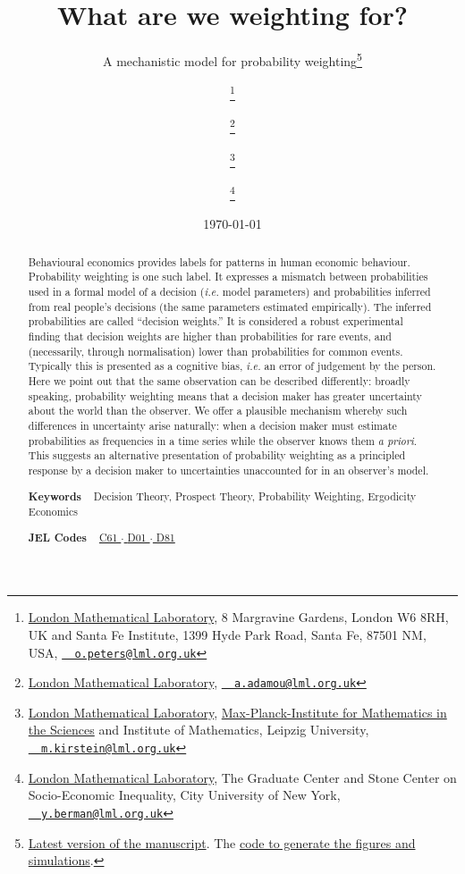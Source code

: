 \documentclass[%
	a4paper,
	abstract=true,	
	12pt,
	numbers=noenddot,
]{scrartcl}
\title{What are we weighting for?}
\subtitle{A mechanistic model for probability weighting\thanks{\href{https://bit.ly/LML-pw}{Latest version of the manuscript}. The \href{https://bit.ly/lml_pw_code}{code to generate the figures and simulations}.}}
\author{
	\person{Ole Peters}\footnote{\href{http://lml.org.uk/people/ole-peters-2}{London Mathematical Laboratory}, 8 Margravine Gardens, London W6 8RH, UK and Santa Fe Institute, 1399 Hyde Park Road, Santa Fe, 87501 NM, USA, \texttt{\href{mailto:o.peters@lml.org.uk}{~\Letter~o.peters@lml.org.uk}}} \and
	\person{Alexander Adamou}\footnote{\href{http://lml.org.uk/people/alex-adamou-2}{London Mathematical Laboratory}, \texttt{\href{mailto:a.adamou@lml.org.uk}{~\Letter~a.adamou@lml.org.uk}}} \and
	\person{Mark Kirstein}\footnote{\href{https://bit.ly/LMLMK}{London Mathematical Laboratory}, \href{https://www.mis.mpg.de/jjost/research/economics.html}{Max-Planck-Institute for Mathematics in the Sciences} and Institute of Mathematics, Leipzig University, \texttt{\href{mailto:m.kirstein@lml.org.uk}{~\Letter~m.kirstein@lml.org.uk}}} \and 
	\person{Yonatan Berman}\footnote{\href{http://lml.org.uk/people/yonatan-berman/}{London Mathematical Laboratory}, The Graduate Center and Stone Center on Socio-Economic Inequality, City University of New York, \texttt{\href{mailto:y.berman@lml.org.uk}{~\Letter~y.berman@lml.org.uk}}}
}
\date{\today}
\newcommand{\ie}{\textit{i.e.}\xspace}
\begin{document}
\begin{titlepage}
	\maketitle
\thispagestyle{fancy}

\begin{abstract}
\noindent 
Behavioural economics provides labels for patterns in human economic behaviour. Probability weighting is one such label. It expresses a mismatch between probabilities used in a formal model of a decision (\ie model parameters) and probabilities inferred from real people's decisions (the same parameters estimated empirically). The inferred probabilities are called ``decision weights.'' It is considered a robust experimental finding that decision weights are higher than probabilities for rare events, and (necessarily, through normalisation) lower than probabilities for common events. Typically this is presented as a cognitive bias, \ie an error of judgement by the person. %
Here we point out that the same observation can be described differently: broadly speaking, probability weighting means that a decision maker has greater uncertainty about the world than the observer.
We offer a plausible mechanism whereby such differences in uncertainty arise naturally: when a decision maker must estimate probabilities as frequencies in a time series while the observer knows them \textit{a priori}. This suggests an alternative presentation of probability weighting as a principled response by a decision maker to uncertainties unaccounted for in an observer's model.
\vspace{1em}

\noindent\textsf{\textbf{Keywords}} ~ Decision Theory, Prospect Theory, Probability Weighting, Ergodicity Economics
\vspace{.5em}

\noindent\textsf{\textbf{JEL Codes}} ~
\href{https://www.aeaweb.org/econlit/jelCodes.php?view=jel#C}{%
C61		%
$\cdot$
}%
\href{https://www.aeaweb.org/econlit/jelCodes.php?view=jel#D}{%
D01 	%
$\cdot$
D81 	%
}
\end{abstract}
\end{titlepage}
 
\end{document}
